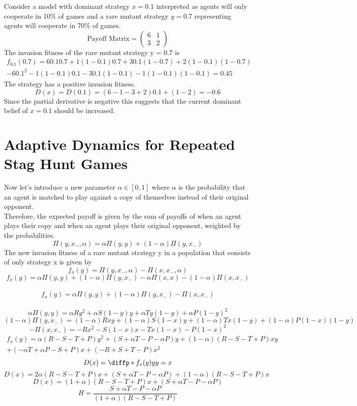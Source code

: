 \documentclass[]{llncs}
\begin{document}
Consider a model with dominant strategy $x = 0.1$ interpreted as agents will only cooperate in 10\% of games and a rare mutant strategy $y = 0.7$ representing agents will cooperate in 70\% of games. 
\[
   \text{Payoff Matrix} = \begin{pmatrix} 
   6 & 1  \\
   3 & 2  
   \end{pmatrix} 
\]
The invasion fitness of the rare mutant strategy y = 0.7 is 
\begin{multline}
f_{0.1}(0.7) = 6 0.1 0.7 + 1 (1-0.1) 0.7 +  3 0.1 (1-0.7) + 2 (1-0.1) (1-0.7) \\ - 6 0.1^2 - 1 (1-0.1) 0.1 - 3 0.1 (1-0.1) - 1 (1-0.1) (1-0.1) = 0.45
\end{multline}
The strategy has a positive invasion fitness.
\[
D(x) = D(0.1) = (6 - 1 - 3 +2) 0.1 + (1-2) = -0.6
\]
Since the partial derivative is negative this suggests that the current dominant belief of $x = 0.1$ should be increased. 


\section{Adaptive Dynamics for Repeated Stag Hunt Games}

Now let's introduce a new parameter $\alpha \in [0, 1]$ where $\alpha$ is the probability that an agent is matched to play against a copy of themselves instead of their original opponent. 
\\
Therefore, the expected payoff is given by the sum of payoffs of when an agent plays their copy and when an agent plays their original opponent, weighted by the probabilities.
\[ 
\Pi ( y, x_{-}, \alpha ) = \alpha \Pi ( y, y) + (1-\alpha) \Pi ( y, x_{-} )
\]
The new invasion fitness of a rare mutant strategy y in a population that consists of only strategy x is given by 
\[
f_x(y) = \Pi ( y, x_{-}, \alpha ) - \Pi ( x, x_{-}, \alpha )
\]
\[
f_x(y) = \alpha \Pi ( y, y) + (1-\alpha) \Pi ( y, x_{-} ) - \alpha \Pi ( x, x) - (1-\alpha) \Pi ( x,  x_{-} )
\]
\
\[
f_x(y) = \alpha \Pi ( y, y) + (1-\alpha) \Pi ( y, x_{-} ) - \Pi ( x,  x_{-} )
\]
\
\[
 \alpha \Pi ( y, y)  = \alpha R y^2 + \alpha S (1-y) y +  \alpha T y (1-y) + \alpha P (1-y)^2
\]
\[
 (1-\alpha) \Pi ( y, x_{-} ) =  (1-\alpha) R x y +  (1-\alpha) S (1-x) y +  (1-\alpha)  T x (1-y) +  (1-\alpha) P (1-x) (1-y)
\]
\[
-\Pi ( x, x_{-} ) = -R x^2 - S (1-x) x -  T x (1-x) - P (1-x)^2
\]
\begin{multline}
f_x(y) = \alpha (R-S-T+P) y^2 +(S + \alpha T - P - \alpha P) y + (1-\alpha) (R-S-T+P) x y \\+ (-\alpha T + \alpha P - S + P) x + (-R+S+T-P) x^2
\end{multline}
\[
D(x) = \diffp*{f_x(y)}{y}{y=x}
\]
\[
D(x) = 2 \alpha (R-S-T+P) x + (S + \alpha T - P - \alpha P) + (1-\alpha) (R-S-T+P) x
\]
\[
D(x) = (1+\alpha) (R-S-T+P) x + (S + \alpha T - P - \alpha P) 
\]
\[
H = \frac{S + \alpha T - P - \alpha P}{(1+\alpha)(R-S-T+P)}
\]

\end{document}
